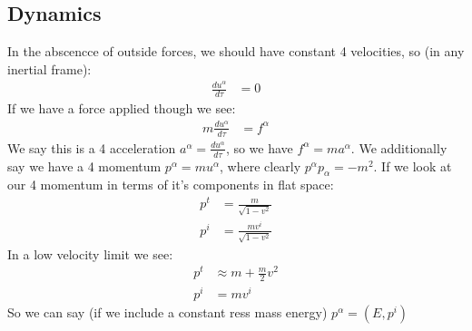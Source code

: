 \subsection{Dynamics}
In the abscencce of outside forces, we should have constant 4 velocities, so (in any inertial frame):
\begin{align*}
	\frac{d u^\alpha}{d\tau} &= 0
\end{align*}
If we have a force applied though we see:
\begin{align*}
	m\frac{d u^\alpha}{d\tau} &= f^\alpha
\end{align*}
We say this is a 4 acceleration $a^\alpha = \frac{d u^\alpha}{d\tau}$, so we have $f^\alpha = m a^\alpha$.
We additionally say we have a 4 momentum $p^\alpha = m u^\alpha$, where clearly $p^\alpha p_\alpha = -m^2$.
If we look at our 4 momentum in terms of it's components in flat space:
\begin{align*}
	p^t &= \frac{m}{\sqrt{1-v^2}} \\
	p^i &= \frac{mv^i}{\sqrt{1-v^2}}
\end{align*}
In a low velocity limit we see:
\begin{align*}
	p^t &\approx m + \frac{m}{2}v^2 \\
	p^i &= m v^i
\end{align*}
So we can say (if we include a constant ress mass energy) $p^\alpha = (E,p^i)$
